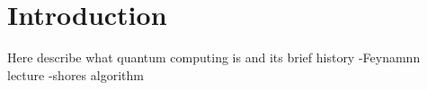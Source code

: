 \chapter*{Introduction}
Here describe what quantum computing is and its brief history
-Feynamnn lecture
-shores algorithm